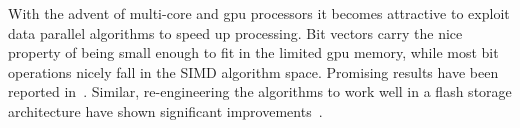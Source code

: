 With the advent of multi-core and gpu processors it becomes attractive to
exploit data parallel algorithms to speed up processing.  Bit vectors carry the
nice property of being small enough to fit in the limited gpu memory, while
most bit operations nicely fall in the SIMD algorithm space. Promising results
have been reported in~\cite{GWB09}. Similar, re-engineering the algorithms to
work well in a flash storage architecture have shown significant
improvements~\cite{WMC10}.

